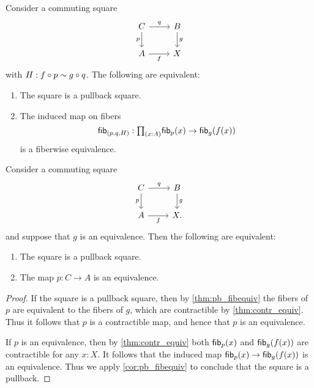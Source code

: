 \begin{cor}\label{cor:pb_fibequiv}
Consider a commuting square
\begin{equation*}
\begin{tikzcd}
C \arrow[r,"q"] \arrow[d,swap,"p"] & B \arrow[d,"g"] \\
A \arrow[r,swap,"f"] & X
\end{tikzcd}
\end{equation*}
with $H:f\circ p\sim g\circ q$. The following are equivalent:
\begin{enumerate}
\item The square is a pullback square.
\item The induced map on fibers
\begin{equation*}
\fibf{(p,q,H)}:\prd{x:A}\fib{p}{x}\to \fib{g}{f(x)}
\end{equation*}
is a fiberwise equivalence.
\end{enumerate}
\end{cor}

\begin{cor}\label{cor:pb_equiv}
Consider a commuting square
\begin{equation*}
\begin{tikzcd}
C \arrow[r,"q"] \arrow[d,swap,"p"] & B \arrow[d,"g"] \\
A \arrow[r,swap,"f"] & X.
\end{tikzcd}
\end{equation*}
and suppose that $g$ is an equivalence. Then the following are equivalent:
\begin{enumerate}
\item The square is a pullback square.
\item The map $p:C\to A$ is an equivalence.
\end{enumerate}
\end{cor}

\begin{proof}
If the square is a pullback square, then by \cref{thm:pb_fibequiv} the fibers of $p$ are equivalent to the fibers of $g$, which are contractible by \cref{thm:contr_equiv}. Thus it follows that $p$ is a contractible map, and hence that $p$ is an equivalence.

If $p$ is an equivalence, then by \cref{thm:contr_equiv} both $\mathsf{fib}_{p}(x)$ and $\mathsf{fib}_{g}(f(x))$ are contractible for any $x:X$. It follows that the induced map $\mathsf{fib}_{p}(x)\to\mathsf{fib}_{g}(f(x))$ is an equivalence. Thus we apply \cref{cor:pb_fibequiv} to conclude that the square is a pullback.
\end{proof}

